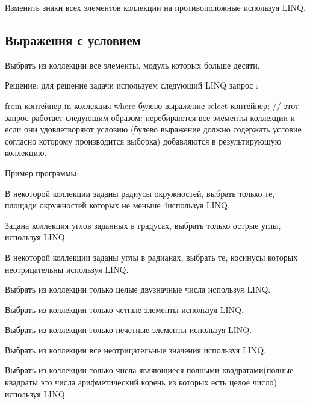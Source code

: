 \task Изменить знаки всех элементов коллекции на противоположные
используя LINQ.


\subsection{Выражения с условием}

Выбрать из коллекции все элементы, модуль которых больше десяти.

Решение: для решение задачи используем следующий LINQ запрос :

from контейнер in коллекция where булево выражение select контейнер;
// этот запрос работает следующим образом: перебираются все элементы
коллекции и если они удовлетворяют условию (булево выражение должно
содержать условие согласно которому производится выборка) добавляются
в результирующую коллекцию.

Пример программы:



\task В некоторой коллекции заданы радиусы окружностей, выбрать только
те, площади окружностей которых не меньше 4используя LINQ.

\task Задана коллекция углов заданных в градусах, выбрать только
острые углы, используя LINQ.

\task В некоторой коллекции заданы углы в радианах, выбрать те,
косинусы которых неотрицательны используя LINQ.

\task Выбрать из коллекции только целые двузначные числа используя
LINQ.

\task Выбрать из коллекции только четные элементы используя LINQ.

\task Выбрать из коллекции только нечетные элементы используя LINQ.

\task Выбрать из коллекции все неотрицательные значения используя
LINQ.

\task Выбрать из коллекции только числа являющиеся полными
квадратами(полные квадраты это числа арифметический корень из которых
есть целое число) используя LINQ.


